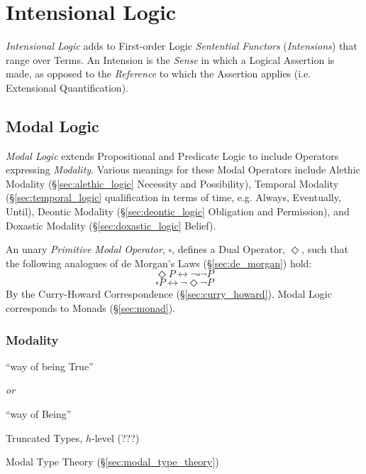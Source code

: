 \section{Intensional Logic}\label{sec:intensional_logic}

\emph{Intensional Logic} adds to First-order Logic \emph{Sentential
  Functors} (\emph{Intensions}) that range over Terms. An Intension is
the \emph{Sense} in which a Logical Assertion is made, as opposed to
the \emph{Reference} to which the Assertion applies (i.e. Extensional
Quantification).



\subsection{Modal Logic}\label{sec:modal_logic}

\emph{Modal Logic} extends Propositional and Predicate Logic to
include Operators expressing \emph{Modality}. Various meanings for
these Modal Operators include Alethic Modality
(\S\ref{sec:alethic_logic} Necessity and Possibility), Temporal
Modality (\S\ref{sec:temporal_logic} qualification in terms of time,
e.g. Always, Eventually, Until), Deontic Modality
(\S\ref{sec:deontic_logic} Obligation and Permission), and Doxastic
Modality (\S\ref{sec:doxastic_logic} Belief).

An unary \emph{Primitive Modal Operator}, $\square$, defines a Dual
Operator, $\Diamond$, such that the following analogues of de Morgan's
Laws (\S\ref{sec:de_morgan}) hold:
\[
  \Diamond P \leftrightarrow \neg \square \neg P
\]
\[
  \square P \leftrightarrow \neg \Diamond \neg P
\]
By the Curry-Howard Correspondence (\S\ref{sec:curry_howard}), Modal
Logic corresponds to Monads (\S\ref{sec:monad}).



\subsubsection{Modality}\label{sec:modality}

``way of being True''

\emph{or}

``way of Being''

Truncated Types, $h$-level (???) %

Modal Type Theory (\S\ref{sec:modal_type_theory})

